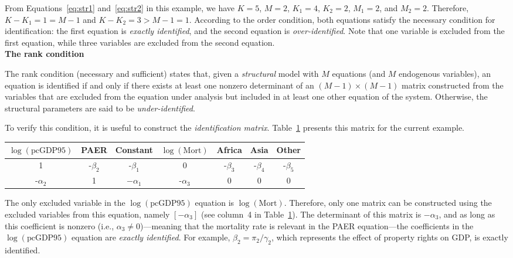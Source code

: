 From Equations~\ref{eq:str1} and~\ref{eq:str2} in this example, we have $K = 5$, $M = 2$, $K_1 = 4$, $K_2 = 2$, $M_1 = 2$, and $M_2 = 2$. Therefore, $K - K_1 = 1 = M - 1$ and $K - K_2 = 3 > M - 1 = 1$. According to the order condition, both equations satisfy the necessary condition for identification: the first equation is \textit{exactly identified}, and the second equation is \textit{over-identified}. Note that one variable is excluded from the first equation, while three variables are excluded from the second equation.\\

\textbf{The rank condition}

The rank condition (necessary and sufficient) states that, given a \textit{structural} model with $M$ equations (and $M$ endogenous variables), an equation is identified if and only if there exists at least one nonzero determinant of an $(M - 1) \times (M - 1)$ matrix constructed from the variables that are excluded from the equation under analysis but included in at least one other equation of the system. Otherwise, the structural parameters are said to be \textit{under-identified}.

To verify this condition, it is useful to construct the \textit{identification matrix}. Table~\ref{tab:71} presents this matrix for the current example.

\begin{table}[!h]
	\label{tab:71}%
	\begin{tabular}{ccccccc}
		$\log(\text{pcGDP95})$ & PAER & Constant & $\log(\text{Mort})$ & Africa & Asia & Other \\
		\hline
		1 & -$\beta_2$ & -$\beta_1$ & 0 & -$\beta_3$ & -$\beta_4$ & -$\beta_5$\\
		-$\alpha_2$ & 1 & $-\alpha_1$ & -$\alpha_3$ & 0 & 0 & 0 \\
	\end{tabular}
\end{table}

The only excluded variable in the $\log(\text{pcGDP95})$ equation is $\log(\text{Mort})$. Therefore, only one matrix can be constructed using the excluded variables from this equation, namely $[-\alpha_3]$ (see column~4 in Table~\ref{tab:71}). The determinant of this matrix is $-\alpha_3$, and as long as this coefficient is nonzero (i.e., $\alpha_3 \neq 0$)—meaning that the mortality rate is relevant in the PAER equation—the coefficients in the $\log(\text{pcGDP95})$ equation are \textit{exactly identified}. For example, $\beta_2 = \pi_2 / \gamma_2$, which represents the effect of property rights on GDP, is exactly identified.

